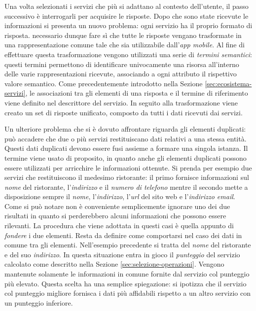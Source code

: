 Una volta selezionati i servizi che più si adattano al contesto dell'utente, il passo successivo è interrogarli per acquisire le risposte. Dopo che sono state ricevute le informazioni si presenta un nuovo problema: ogni servizio ha il proprio formato di risposta. \upe necessario dunque fare sì che tutte le risposte vengano trasformate in una rappresentazione comune tale che sia utilizzabile dall'\emph{app mobile}. Al fine di effettuare questa trasformazione vengono utilizzati una serie di \emph{termini semantici}: questi termini permettono di identificare univocamente una risorsa all'interno delle varie rappresentazioni ricevute, associando a ogni attributo il rispettivo valore semantico. Come precedentemente introdotto nella Sezione \ref{sec:ecosistema-servizi}, le associazioni tra gli elementi di una risposta e il termine di riferimento viene definito nel descrittore del servizio. In seguito alla trasformazione viene creato un set di risposte unificato, composto da tutti i dati ricevuti dai servizi.

Un ulteriore problema che si è dovuto affrontare riguarda gli elementi duplicati: può accadere che due o più servizi restituiscano dati relativi a una stessa entità. Questi dati duplicati devono essere fusi assieme a formare una singola istanza. Il termine  viene usato di proposito, in quanto anche gli elementi duplicati possono essere utilizzati per arricchire le informazioni ottenute. Si prenda per esempio due servizi che restituiscono il medesimo ristorante: il primo fornisce informazioni sul \emph{nome} del ristorante, l'\emph{indirizzo} e il \emph{numero di telefono} mentre il secondo mette a disposizione sempre il \emph{nome}, l'\emph{indirizzo}, l'\emph{url} del sito web e l'\emph{indirizzo email}. Come si può notare non è conveniente semplicemente ignorare uno dei due risultati in quanto si perderebbero alcuni informazioni che possono essere rilevanti. La procedura che viene adottata in questi casi è quella appunto di \emph{fondere} i due elementi. Resta da definire come comportarsi nel caso dei dati in comune tra gli elementi. Nell'esempio precedente si tratta del \emph{nome} del ristorante e del suo \emph{indirizzo}. In questa situazione entra in gioco il \emph{punteggio} del servizio calcolato come descritto nella Sezione \ref{sec:selezione-operazioni}. Vengono mantenute solamente le informazioni in comune fornite dal servizio col punteggio più elevato. Questa scelta ha una semplice spiegazione: si ipotizza che il servizio col punteggio migliore fornisca i dati più affidabili rispetto a un altro servizio con un punteggio inferiore.

